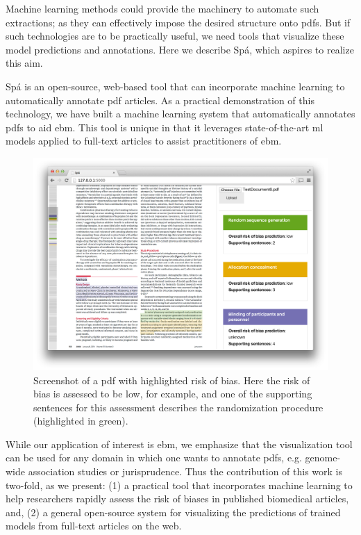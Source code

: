 \documentclass{llncs}
\begin{document}
Machine learning methods could provide the machinery to automate such extractions; as they can effectively impose the desired structure onto \acp{pdf}.
But if such technologies are to be practically useful, we need tools that visualize these model predictions and annotations.
Here we describe Spá, which aspires to realize this aim.

Spá is an open-source, web-based tool that can incorporate machine learning to automatically annotate \ac{pdf} articles.
As a practical demonstration of this technology, we have built a machine learning system that automatically annotates \acp{pdf} to aid \ac{ebm}.
This tool is unique in that it leverages state-of-the-art \ac{ml} models applied to full-text articles to assist practitioners of \ac{ebm}.

\begin{figure}[htb]
\vspace{-1em}
\centering
\includegraphics[width=0.8\linewidth]{./images/screenshot2.png}
\vspace{-1em}
\caption{\label{fig:screenshot}Screenshot of a \ac{pdf} with highlighted risk of bias. Here the risk of bias is assessed to be low, for example, and one of the supporting sentences for this assessment describes the randomization procedure (highlighted in green).}
\vspace{-1.5em}
\end{figure}

While our application of interest is \ac{ebm}, we emphasize that the visualization tool can be used for any domain in which one wants to annotate \acp{pdf}, e.g. genome-wide association studies or jurisprudence.
Thus the contribution of this work is two-fold, as we present:
(1) a practical tool that incorporates machine learning to help researchers rapidly assess the risk of biases in published biomedical articles, and,
(2) a general open-source system for visualizing the predictions of trained models from full-text articles on the web.
\end{document}
